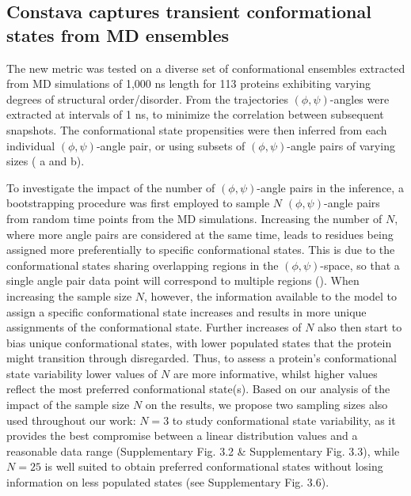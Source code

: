 \subsection{Constava captures transient conformational states from MD ensembles} 
\label{section:multi_sample}

The new metric was tested on a diverse set of conformational ensembles extracted from  MD simulations of 1,000 ns length for 113 proteins exhibiting varying degrees of structural order/disorder. From the trajectories $(\phi, \psi)$-angles were extracted at intervals of 1 ns, to minimize the correlation between subsequent snapshots. The conformational state propensities were then inferred from each individual $(\phi, \psi)$-angle pair, or using subsets of $(\phi, \psi)$-angle pairs of varying sizes ( a and b).

To investigate the impact of the number of $(\phi, \psi)$-angle pairs in the inference, a bootstrapping procedure was first employed to sample $N$ $(\phi, \psi)$-angle pairs from random time points from the MD simulations. Increasing the number of $N$, where more angle pairs are considered at the same time, leads to residues being assigned more preferentially to specific conformational states. This is due to the conformational states sharing overlapping regions in the $(\phi, \psi)$-space, so that a single angle pair data point will correspond to multiple regions (). When increasing the sample size $N$, however, the information available to the model to assign a specific conformational state increases and results in more unique assignments of the conformational state. Further increases of $N$ also then start to bias unique conformational states, with lower populated states that the protein might transition through disregarded. Thus, to assess a protein's conformational state variability lower values of $N$ are more informative, whilst higher values reflect the most preferred conformational state(s). Based on our analysis of the impact of the sample size $N$ on the results, we propose two sampling sizes also used throughout our work: $N = 3$ to study conformational state variability, as it provides the best compromise between a linear distribution values and a reasonable data range (Supplementary Fig. 3.2 \& Supplementary Fig. 3.3),
while $N = 25$ is well suited to obtain preferred conformational states without losing information on less populated states (see Supplementary Fig. 3.6).

